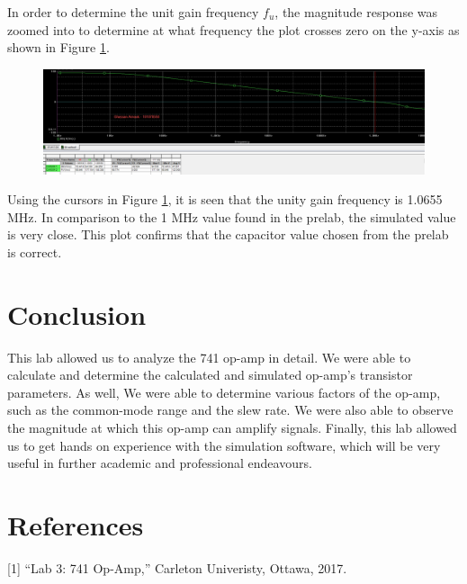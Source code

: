 \documentclass{article}
\begin{document}
	\noindent In order to determine the unit gain frequency $f_u$, the magnitude response was zoomed into to determine at what frequency the plot crosses zero on the y-axis as shown in Figure \ref{f:12}.
	
	\pagebreak
	\begin{figure}[!ht]
		\centering
		\includegraphics[width=0.7\textheight]{3.1.png}
		\label{f:12}
	\end{figure}
	\noindent Using the cursors in Figure \ref{f:12}, it is seen that the unity gain frequency is 1.0655 MHz. 
	In comparison to the 1 MHz value found in the prelab, the simulated value is very close. 
	This plot confirms that the capacitor value chosen from the prelab is correct.
	
	\pagebreak
	\section{Conclusion}
	This lab allowed us to analyze the 741 op-amp in detail. We were able to calculate and determine the calculated and simulated op-amp’s transistor parameters. As well, We were able to determine various factors of the op-amp, such as the common-mode range and the slew rate. We were also able to observe the magnitude at which this op-amp can amplify signals. Finally, this lab allowed us to get hands on experience with the simulation software, which will be very useful in further academic and professional endeavours.
	
	\pagebreak
	\section{References}
	[1] “Lab 3: 741 Op-Amp,” Carleton Univeristy, Ottawa, 2017.
	
	\pagebreak
\end{document}
